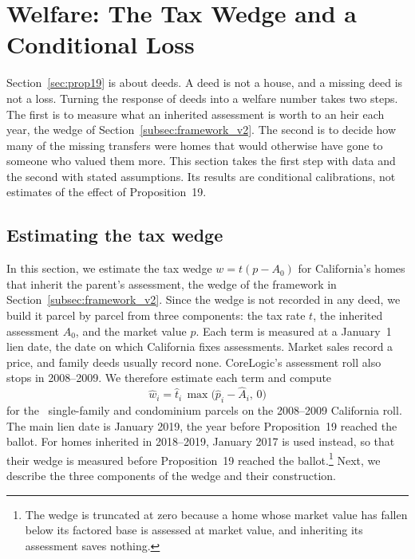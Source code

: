 \section{Welfare: The Tax Wedge and a Conditional Loss}\label{sec:framework}\label{sec:welfare}

Section~\ref{sec:prop19} is about deeds. A deed is not a house, and a missing deed is not a loss. Turning the response of deeds into a welfare number takes two steps. The first is to measure what an inherited assessment is worth to an heir each year, the wedge of Section~\ref{subsec:framework_v2}. The second is to decide how many of the missing transfers were homes that would otherwise have gone to someone who valued them more. This section takes the first step with data and the second with stated assumptions. Its results are conditional calibrations, not estimates of the effect of Proposition~19.

\subsection{Estimating the tax wedge}\label{subsec:wedge}

In this section, we estimate the tax wedge $w=t(p-A_0)$ for California's homes that inherit the parent's assessment, the wedge of the framework in Section~\ref{subsec:framework_v2}. Since the wedge is not recorded in any deed, we build it parcel by parcel from three components: the tax rate $t$, the inherited assessment $A_0$, and the market value $p$. Each term is measured at a January~1 lien date, the date on which California fixes assessments. 
Market sales record a price, and family deeds usually record none. CoreLogic's assessment roll also stops in 2008--2009. We therefore estimate each term and compute
\begin{equation}
  \hat w_i=\hat t_i\,\max\bigl(\hat p_i-\hat A_i,\,0\bigr)
  \label{eq:wedge_hat}
\end{equation}
for the \WedgeParcels\ single-family and condominium parcels on the
2008--2009 California roll. The main lien date is
January 2019, the year before Proposition~19 reached the ballot. For homes inherited in 2018--2019, January 2017 is used instead, so that
their wedge is measured before Proposition~19 reached the ballot.\footnote{
The wedge is truncated at zero because a home whose market value has fallen
below its factored base is assessed at market value, and inheriting its
assessment saves nothing.} Next, we describe the three components of the wedge and their construction.

